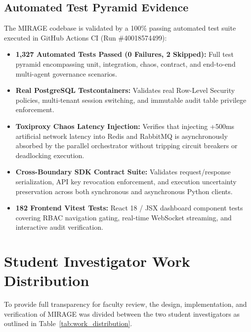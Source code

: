 \documentclass[11pt,a4paper]{article}
\begin{document}
\subsection{Automated Test Pyramid Evidence}
The MIRAGE codebase is validated by a 100\% passing automated test suite executed in GitHub Actions CI (Run \#40018574499):
\begin{itemize}[leftmargin=*,itemsep=2pt]
  \item \textbf{1,327 Automated Tests Passed (0 Failures, 2 Skipped):} Full test pyramid encompassing unit, integration, chaos, contract, and end-to-end multi-agent governance scenarios.
  \item \textbf{Real PostgreSQL Testcontainers:} Validates real Row-Level Security policies, multi-tenant session switching, and immutable audit table privilege enforcement.
  \item \textbf{Toxiproxy Chaos Latency Injection:} Verifies that injecting +500ms artificial network latency into Redis and RabbitMQ is asynchronously absorbed by the parallel orchestrator without tripping circuit breakers or deadlocking execution.
  \item \textbf{Cross-Boundary SDK Contract Suite:} Validates request/response serialization, API key revocation enforcement, and execution uncertainty preservation across both synchronous and asynchronous Python clients.
  \item \textbf{182 Frontend Vitest Tests:} React 18 / JSX dashboard component tests covering RBAC navigation gating, real-time WebSocket streaming, and interactive audit verification.
\end{itemize}

\section{Student Investigator Work Distribution}

To provide full transparency for faculty review, the design, implementation, and verification of MIRAGE was divided between the two student investigators as outlined in Table~\ref{tab:work_distribution}.
\end{document}

